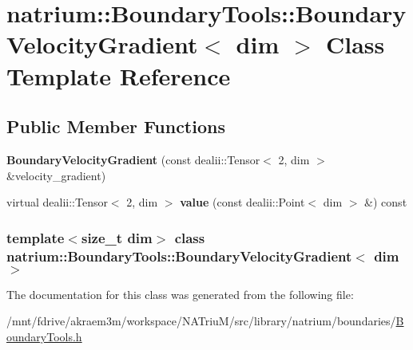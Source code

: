 \hypertarget{classnatrium_1_1BoundaryTools_1_1BoundaryVelocityGradient}{
\section{natrium::BoundaryTools::BoundaryVelocityGradient$<$ dim $>$ Class Template Reference}
\label{classnatrium_1_1BoundaryTools_1_1BoundaryVelocityGradient}
}
\subsection*{Public Member Functions}
\begin{DoxyCompactItemize}
\item 
\hypertarget{classnatrium_1_1BoundaryTools_1_1BoundaryVelocityGradient_af736088b755d7e64722f1af8329d45b9}{
{\bfseries BoundaryVelocityGradient} (const dealii::Tensor$<$ 2, dim $>$ \&velocity\_\-gradient)}
\label{classnatrium_1_1BoundaryTools_1_1BoundaryVelocityGradient_af736088b755d7e64722f1af8329d45b9}

\item 
\hypertarget{classnatrium_1_1BoundaryTools_1_1BoundaryVelocityGradient_a78422e38ce40181202e54509aa42354e}{
virtual dealii::Tensor$<$ 2, dim $>$ {\bfseries value} (const dealii::Point$<$ dim $>$ \&) const }
\label{classnatrium_1_1BoundaryTools_1_1BoundaryVelocityGradient_a78422e38ce40181202e54509aa42354e}

\end{DoxyCompactItemize}
\subsubsection*{template$<$size\_\-t dim$>$ class natrium::BoundaryTools::BoundaryVelocityGradient$<$ dim $>$}



The documentation for this class was generated from the following file:\begin{DoxyCompactItemize}
\item 
/mnt/fdrive/akraem3m/workspace/NATriuM/src/library/natrium/boundaries/\hyperlink{BoundaryTools_8h}{BoundaryTools.h}\end{DoxyCompactItemize}
